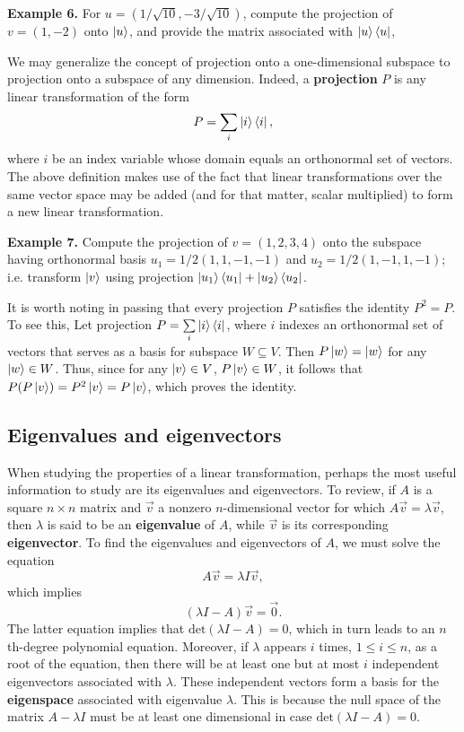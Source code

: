 \documentclass [12pt]{article}
\theoremstyle{definition}
\begin{document}
\newpage
\textbf{Example 6.} For $u=(1/\sqrt{10},-3/\sqrt{10})$, compute the projection of $v=(1,-2)$ onto $\ket{u}$, and provide the matrix associated with 
$\ket{u}\bra{u}$,


\vspace{3.0in}
We may generalize the concept of projection onto a one-dimensional subspace to projection onto a subspace of any dimension.
Indeed, a \textbf{projection} $P$ is any linear transformation of the 
form
\[P=\sum_i \ket{i}\bra{i},\]
where $i$ be an index variable whose domain equals an orthonormal set of vectors. The above definition makes use of the fact that linear transformations over the same vector space
may be added (and for that matter, scalar multiplied) to form a new linear transformation.
 


\textbf{Example 7.} Compute the projection of $v=(1,2,3,4)$ onto the subspace having orthonormal basis $u_1=1/2(1,1,-1,-1)$ and 
$u_2=1/2(1,-1,1,-1)$; i.e. transform $\ket{v}$ using projection $\ket{u_1}\bra{u_1}+ \ket{u_2}\bra{u_2}$.



\vspace{3.0in}

It is worth noting in passing that every projection $P$ satisfies the identity $P^2 = P$. To see this, Let projection $P=\underset{i}{\sum} \ket{i}\bra{i}$, 
where $i$ indexes an orthonormal set of vectors that serves as a basis for subspace $W\subseteq V$. 
 Then $P\ket{w} = \ket{w}$ for any $\ket{w}\in W$. Thus, since for any $\ket{v}\in V$,
  $P\ket{v}\in W$, it follows that
 $P(P\ket{v}) = P^2\ket{v} = P\ket{v}$, which proves the identity.

\subsection*{Eigenvalues and eigenvectors}

When studying the properties of a linear transformation, perhaps the most useful information to study are its
eigenvalues and eigenvectors. To review, if $A$ is a square $n\times n$ matrix and $\vec{v}$ a nonzero $n$-dimensional vector for which
$A\vec{v}=\lambda \vec{v}$, then $\lambda$ is said to be an \textbf{eigenvalue} of $A$, while  $\vec{v}$ is its corresponding \textbf{eigenvector}.
To find the eigenvalues and eigenvectors of $A$, we must solve the equation 
\[A\vec{v} = \lambda I\vec{v},\]
which implies 
\[(\lambda I - A)\vec{v} = \vec{0}.\]
The latter equation implies that  $\mbox{det}(\lambda I - A)=0$, which in turn leads to an $n$th-degree polynomial equation. Moreover, if $\lambda$ appears $i$ times, $1\leq i\leq n$,
as a root of the equation, then there will be at least one but at most $i$ independent eigenvectors associated with $\lambda$. These independent vectors form a basis
for the \textbf{eigenspace} associated with eigenvalue $\lambda$. 
This is because the null space of the matrix $A-\lambda I$ must be at least one dimensional in case $\mbox{det}(\lambda I - A)=0$.
\end{document}
